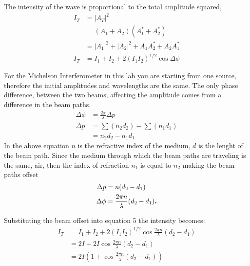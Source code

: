 	The intensity of the wave is proportional to the total amplitude squared, 
	\begin{align}\label{eqn:Intensity}
	\nonumber I_{T} &=|A_{T}|^{2} \\
	\nonumber &=(A_{1}+A_{2})(A_1^*+A_2^*) \\
	\nonumber &=|A_1|^{2} +|A_2|^{2} +A_1 A_2^* +A_2 A_1^* \\
		I_{T} &=I_1 + I_2 +2(I_1 I_2)^{1/2} \cos{\Delta \phi}
	\end{align}

	For the Michelson Interferometer in this lab you are starting from one source, therefore the initial amplitudes and wavelengths are the same. The only phase difference, between the two beams, affecting the amplitude comes from a difference in the beam paths. 
	\begin{align}\label{eqn:offset}
		\nonumber \Delta \phi &=\frac{2\pi}{\lambda} \Delta p \\
		\nonumber \Delta p &=\sum(n_2 d_2)-\sum(n_1 d_1) \\
				&=n_2 d_2 - n_1 d_1
	\end{align} 
In the above equation $n$ is the refractive index of the medium, $d$ is the lenght of the beam path. Since the medium through which the beam paths are traveling is the same, air, then the index of refraction $n_1$ is equal to $n_2$ making the beam paths offset 
	\begin{align}\label{eqn:offset2}
		\nonumber \Delta p &=n(d_2 - d_1) \\
		\Delta \phi &=\frac{2\pi n}{\lambda}(d_2 -d_1) \text{\textbf{.}}
	\end{align}

	Substituting the beam offset into equation 5 the intensity becomes:
	\begin{align}\label{Intensity2}
		\nonumber I_{T} &=I_1 +I_2 +2(I_1 I_2)^{1/2} \cos{\frac{2\pi n}{\lambda}(d_2 -d_1)} \\
		\nonumber &=2I +2I\cos{\frac{2\pi n}{\lambda}(d_2 -d_1)} \\
		\nonumber &=2I(1+\cos{\frac{2\pi n}{\lambda}(d_2 -d_1)})
	\end{align}
